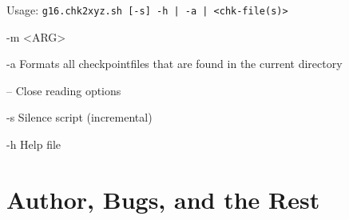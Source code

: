 \documentclass[   %
  final,          %
  a4paper,        %
  rscols=3,       %
  margin=1.0cm,   %
]{refsheet}
\begin{document}
Usage: \texttt{g16.chk2xyz.sh [-s] -h | -a | <chk-file(s)>}

\begin{rslisttt}{-m <ARG>}
  \item[-a      ] Formats all checkpointfiles that are found in the current directory
  \item[--      ] Close reading options
  \item[-s      ] Silence script (incremental)
  \item[-h      ] Help file 
\end{rslisttt}

\vfill
\section{Author, Bugs, and the Rest}

\end{document}
